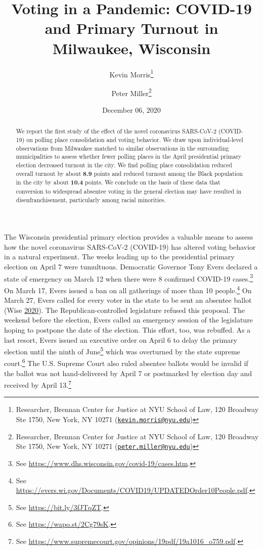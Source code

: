 \documentclass[
  12pt,
]{article}
\title{Voting in a Pandemic: COVID-19 and Primary Turnout in Milwaukee, Wisconsin}
\author{Kevin Morris\footnote{Researcher, Brennan Center for Justice at NYU School of Law, 120 Broadway Ste 1750, New York, NY 10271 (\href{mailto:kevin.morris@nyu.edu}{\nolinkurl{kevin.morris@nyu.edu}})} \and Peter Miller\footnote{Researcher, Brennan Center for Justice at NYU School of Law, 120 Broadway Ste 1750, New York, NY 10271 (\href{mailto:peter.miller@nyu.edu}{\nolinkurl{peter.miller@nyu.edu}})}}
\date{December 06, 2020}
\begin{document}
\maketitle
\begin{abstract}
We report the first study of the effect of the novel coronavirus SARS-CoV-2 (COVID-19) on polling place consolidation and voting behavior. We draw upon individual-level observations from Milwaukee matched to similar observations in the surrounding municipalities to assess whether fewer polling places in the April presidential primary election decreased turnout in the city. We find polling place consolidation reduced overall turnout by about \textbf{8.9} points and reduced turnout among the Black population in the city by about \textbf{10.4} points. We conclude on the basis of these data that conversion to widespread absentee voting in the general election may have resulted in disenfranchisement, particularly among racial minorities.
\end{abstract}

\pagebreak

\doublespacing

The Wisconsin presidential primary election provides a valuable means to assess how the novel coronavirus SARS-CoV-2 (COVID-19) has altered voting behavior in a natural experiment. The weeks leading up to the presidential primary election on April 7 were tumultuous. Democratic Governor Tony Evers declared a state of emergency on March 12 when there were 8 confirmed COVID-19 cases.\footnote{See \url{https://www.dhs.wisconsin.gov/covid-19/cases.htm}.} On March 17, Evers issued a ban on all gatherings of more than 10 people.\footnote{See \url{https://evers.wi.gov/Documents/COVID19/UPDATEDOrder10People.pdf}.} On March 27, Evers called for every voter in the state to be sent an absentee ballot (Wise \protect\hyperlink{ref-Wise2020}{2020}). The Republican-controlled legislature refused this proposal. The weekend before the election, Evers called an emergency session of the legislature hoping to postpone the date of the election. This effort, too, was rebuffed. As a last resort, Evers issued an executive order on April 6 to delay the primary election until the ninth of June\footnote{See \url{https://bit.ly/3fJTqZT}.} which was overturned by the state supreme court.\footnote{See \url{https://wapo.st/2Cg79sK}.} The U.S. Supreme Court also ruled absentee ballots would be invalid if the ballot was not hand-delivered by April 7 or postmarked by election day and received by April 13.\footnote{See \url{https://www.supremecourt.gov/opinions/19pdf/19a1016_o759.pdf}.}
\end{document}
